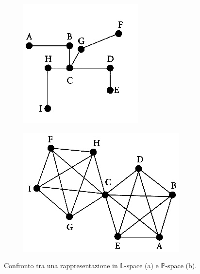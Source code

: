 \vspace{1em}
\begin{figure}[h!]
  \centering
  \begin{subfigure}[b]{0.2\textwidth}
    \centering
    \includegraphics[width=\textwidth]{Immagini/Capitoli/cap2/L-space.jpg}
    \caption{}
    \label{fig:a l-space}
  \end{subfigure}
  \hspace{0.1\textwidth}
  \begin{subfigure}[b]{0.3\textwidth}
    \centering
    \includegraphics[width=\textwidth]{Immagini/Capitoli/cap2/P-space.jpg}
    \caption{}
    \label{fig:b p-space}
  \end{subfigure}
  \caption{Confronto tra una rappresentazione in $\mathbb{L}$-space (a) e $\mathbb{P}$-space (b).}
  \label{fig:confronto L-space P-space}
\end{figure}
\vspace{1em}

